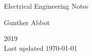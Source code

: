 %	
%	
\begin{titlepage}
	\center\vspace*{1cm}
	
	\begin{center}
	\end{center}
	\vspace*{2em}
	{\LARGE Electrical Engineering Notes}
	
	\vspace*{1em}
	Gunther Abbot
	
	\vfill
	{\small 2019\\ Last updated \today}
\end{titlepage}
\tableofcontents